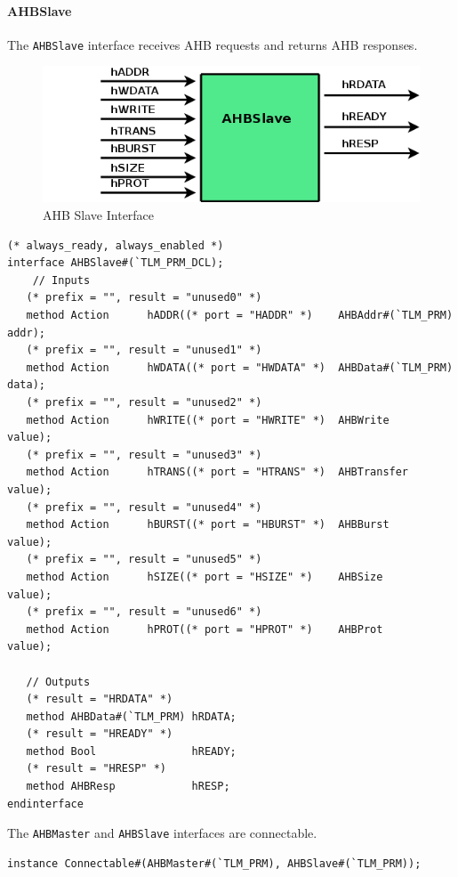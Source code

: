 \documentclass[twoside,letterpaper]{article}
\newcommand{\te}[1]{\texttt{#1}}
\begin{document}
\paragraph{\bf AHBSlave} The \te{AHBSlave} interface receives AHB requests 
and returns AHB responses.

\begin{figure}[ht]
\begin{center}
\includegraphics[height = 1 in]{AHBSlaveFC}
\caption{AHB Slave Interface}
\label{AHBSlave}
\end{center}
\end{figure}

\begin{verbatim}
(* always_ready, always_enabled *)
interface AHBSlave#(`TLM_PRM_DCL);
    // Inputs
   (* prefix = "", result = "unused0" *)
   method Action      hADDR((* port = "HADDR" *)    AHBAddr#(`TLM_PRM) addr);
   (* prefix = "", result = "unused1" *)
   method Action      hWDATA((* port = "HWDATA" *)  AHBData#(`TLM_PRM) data);
   (* prefix = "", result = "unused2" *)
   method Action      hWRITE((* port = "HWRITE" *)  AHBWrite    value);
   (* prefix = "", result = "unused3" *)
   method Action      hTRANS((* port = "HTRANS" *)  AHBTransfer value);
   (* prefix = "", result = "unused4" *)
   method Action      hBURST((* port = "HBURST" *)  AHBBurst    value);
   (* prefix = "", result = "unused5" *)
   method Action      hSIZE((* port = "HSIZE" *)    AHBSize     value);
   (* prefix = "", result = "unused6" *)
   method Action      hPROT((* port = "HPROT" *)    AHBProt     value);
   
   // Outputs
   (* result = "HRDATA" *)
   method AHBData#(`TLM_PRM) hRDATA;
   (* result = "HREADY" *)
   method Bool               hREADY;
   (* result = "HRESP" *)
   method AHBResp            hRESP;
endinterface
\end{verbatim}

The \te{AHBMaster} and \te{AHBSlave} interfaces are connectable.

\begin{verbatim}
instance Connectable#(AHBMaster#(`TLM_PRM), AHBSlave#(`TLM_PRM));
\end{verbatim}

\end{document}
